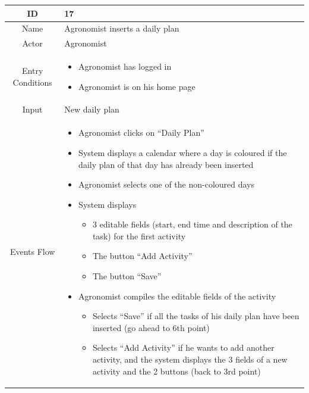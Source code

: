 \documentclass{article}
\begin{document}
\begin{center}
    \begin{longtable}{|c| p{10cm}|}
        \hline
            ID & 17 \\
        \hline
            Name & Agronomist inserts a daily plan\\
        \hline
            Actor & Agronomist \\
        \hline
            Entry Conditions &  \begin{itemize}
                                    \item Agronomist has logged in
                                    \item Agronomist is on his home page
                                \end{itemize}\\
        \hline
            Input & New daily plan \\
        \hline
            Events Flow &   \begin{itemize}
                                \item Agronomist clicks on “Daily Plan” 
                                \item System displays a calendar where a day is coloured if the daily plan of that day has already been inserted
                                \item Agronomist selects one of the non-coloured days
                                \item System displays
                                            \begin{itemize}
                                                \item 3 editable fields (start, end time and description of the task) for the first activity 
                                                \item The button “Add Activity”
                                                \item The button “Save”
                                            \end{itemize}
                                \item Agronomist compiles the editable fields of the activity 
                                            \begin{itemize}
                                                \item Selects “Save” if all the tasks of his daily plan have been inserted (go ahead to 6th point)
                                                \item Selects “Add Activity” if he wants to add another activity, and the system displays the 3 fields of a new activity and the 2 buttons (back to 3rd point)

\end{itemize}
\end{itemize}
\end{longtable}
\end{center}
\end{document}
